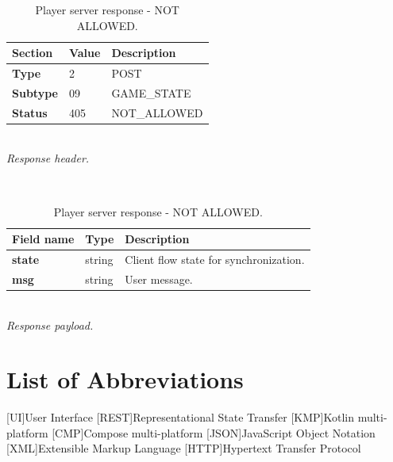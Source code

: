 \documentclass[english, sem, kiv, he, iso690alph, pdf, viewonly]{fasthesis}
\begin{document}
\begin{table}[h!]
	\centering
	\begin{minipage}[b]{1.0\textwidth}
		\centering
		\begin{tabular}{|l|l|l|}
			\hline
			\textbf{Section} & \textbf{Value} & \textbf{Description} \\ \hline
			\textbf{Type} & 2 & \footnotesize{POST} \\ \hline
			\textbf{Subtype} & 09 & \footnotesize{GAME\_STATE}  \\ \hline
			\textbf{Status} & 405 & \footnotesize{NOT\_ALLOWED} \\ \hline
		\end{tabular} \\
		\textit{Response header.}
	\end{minipage}
	\\
	\vspace{10pt}
	\begin{minipage}[b]{1.0\textwidth}
		\centering
		\begin{tabular}{|l|l|l|}
			\hline
			\textbf{Field name} & \textbf{Type} & \textbf{Description} \\ \hline
			\textbf{state} & string & Client flow state for synchronization. \\ \hline
            \textbf{msg} & string & User message. \\ \hline
		\end{tabular} \\
		\textit{Response payload.}
	\end{minipage}	
	\caption{Player server response - NOT ALLOWED.}
	\label{tab:player_move_response__not_allowed}
\end{table}
\newpage


%
%
%
%

\appendix
%
%
%
%
\chapter{List of Abbreviations}\label{app:abbreviations}

\begin{acronym}
[UI]{User Interface}
[REST]{Representational State Transfer}
[KMP]{Kotlin multi-platform}
[CMP]{Compose multi-platform}
[JSON]{JavaScript Object Notation}
[XML]{Extensible Markup Language}
[HTTP]{Hypertext Transfer Protocol}
\end{acronym}
\end{document}
